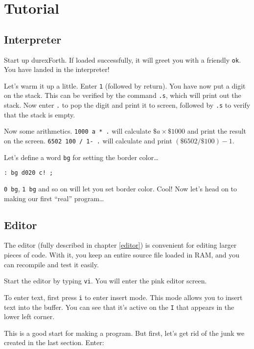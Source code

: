 \chapter{Tutorial}

\section{Interpreter}

Start up durexForth. If loaded successfully, it will greet you with a friendly \texttt{ok}. You have landed in the interpreter!

Let's warm it up a little. Enter \texttt{1} (followed by return). You have now put a digit on the stack. This can be verified by the command \texttt{.s}, which will print out the stack. Now enter \texttt{.} to pop the digit and print it to screen, followed by \texttt{.s} to verify that the stack is empty.

Now some arithmetics. \texttt{1000 a * .} will calculate $\$a \times \$1000$ and print the result on the screen. \texttt{6502 100 / 1- .} will calculate and print $(\$6502 / \$100) - 1$.

Let's define a word \texttt{bg} for setting the border color\ldots 

\begin{verbatim}
: bg d020 c! ;
\end{verbatim}

\texttt{0 bg}, \texttt{1 bg} and so on will let you set border color. Cool! Now let's head on to making our first ``real'' program\ldots

\section{Editor}

The editor (fully described in chapter \ref{editor}) is convenient for editing larger pieces of code. With it, you keep an entire source file loaded in RAM, and you can recompile and test it easily.

Start the editor by typing \texttt{vi}. You will enter the pink editor screen.

To enter text, first press \texttt{i} to enter insert mode. This mode allows you to insert text into the buffer. You can see that it's active on the \texttt{I} that appears in the lower left corner.

This is a good start for making a program. But first, let's get rid of the junk we created in the last section. Enter:

